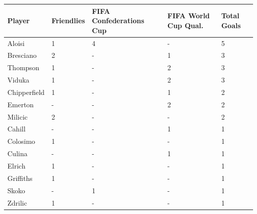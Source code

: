 \documentclass{article}
\begin{document}
\begin{tabular}{lllll}
\toprule
Player & Friendlies & FIFA Confederations Cup & FIFA World Cup Qual. & Total Goals \\
\midrule
Aloisi & 1 & 4 & - & 5 \\
Bresciano & 2 & - & 1 & 3 \\
Thompson & 1 & - & 2 & 3 \\
Viduka & 1 & - & 2 & 3 \\
Chipperfield & 1 & - & 1 & 2 \\
Emerton & - & - & 2 & 2 \\
Milicic & 2 & - & - & 2 \\
Cahill & - & - & 1 & 1 \\
Colosimo & 1 & - & - & 1 \\
Culina & - & - & 1 & 1 \\
Elrich & 1 & - & - & 1 \\
Griffiths & 1 & - & - & 1 \\
Skoko & - & 1 & - & 1 \\
Zdrilic & 1 & - & - & 1 \\
\bottomrule
\end{tabular}
\end{document}
